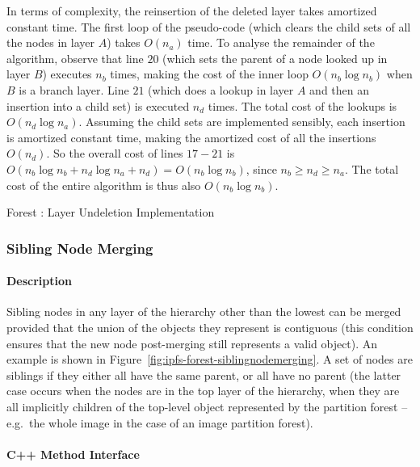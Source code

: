 In terms of complexity, the reinsertion of the deleted layer takes amortized constant time. The first loop of the pseudo-code (which clears the child sets of all the nodes in layer $A$) takes $O(n_a)$ time. To analyse the remainder of the algorithm, observe that line $20$ (which sets the parent of a node looked up in layer $B$) executes $n_b$ times, making the cost of the inner loop $O(n_b \log n_b)$ when $B$ is a branch layer. Line $21$ (which does a lookup in layer $A$ and then an insertion into a child set) is executed $n_d$ times. The total cost of the lookups is $O(n_d \log n_a)$. Assuming the child sets are implemented sensibly, each insertion is amortized constant time, making the amortized cost of all the insertions $O(n_d)$. So the overall cost of lines $17-21$ is $O(n_b \log n_b + n_d \log n_a + n_d) = O(n_b \log n_b)$, since $n_b \ge n_d \ge n_a$. The total cost of the entire algorithm is thus also $O(n_b \log n_b)$.

\begin{stulisting}[p]
\caption{Forest : Layer Undeletion Implementation}
\label{code:ipfs-forest-undeletelayerimpl}

\end{stulisting}

\subsubsection{Sibling Node Merging}

\paragraph{Description}

Sibling nodes in any layer of the hierarchy other than the lowest can be merged provided that the union of the objects they represent is contiguous (this condition ensures that the new node post-merging still represents a valid object). An example is shown in Figure~\ref{fig:ipfs-forest-siblingnodemerging}. A set of nodes are siblings if they either all have the same parent, or all have no parent (the latter case occurs when the nodes are in the top layer of the hierarchy, when they are all implicitly children of the top-level object represented by the partition forest -- e.g.~the whole image in the case of an image partition forest).

\paragraph{C++ Method Interface}


